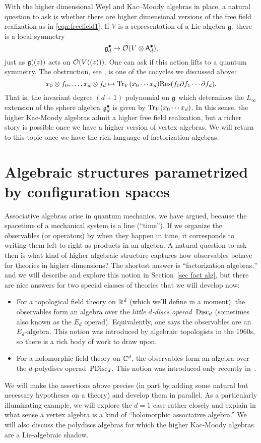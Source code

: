 \documentclass[11pt]{amsart}
\begin{document}
With the higher dimensional Weyl and Kac--Moody algebras in place, a natural question to ask is whether there are higher dimensional versions of the free field realization as in \eqref{eqn:freefield1}. 
If $V$ is a representation of a Lie algebra $\mathfrak g$,
there is a local symmetry 
\[
\mathfrak g^\bullet_d \to \mathcal O(V \otimes \mathsf A^{\bullet}_d),
\]
just as $\mathfrak g((z))$ acts on $\mathcal O(V((z)))$. 
One can ask if this action lifts to a quantum symmetry.
The obstruction, see \cite{GWkm}, is one of the cocycles we discussed above:
\[
x_0 \otimes f_0, \ldots, x_{d} \otimes f_{d} \mapsto {\rm Tr}_V( x_0 \cdots x_{d}) {\rm Res}(f_0 \partial f_1 \cdots \partial f_{d}).
\]
That is, the invariant degree $(d+1)$ polynomial on $\mathfrak g$ which determines the $L_\infty$ extension of the sphere algebra $\mathfrak g_d^\bullet$ is given by ${\rm Tr}_V (x_0 \cdots x_{d})$.
In this sense, the higher Kac-Moody algebras admit a higher free field realization,
but a richer story is possible once we have a higher version of vertex algebras.
We will return to this topic once we have the rich language of factorization algebras.

\section{Algebraic structures parametrized by configuration spaces}

Associative algebras arise in quantum mechanics, we have argued, because the spacetime of a mechanical system is a line (``time'').
If we organize the observables (or operators) by when they happen in time,
it corresponds to writing them left-to-right as products in an algebra.
A natural question to ask then is what kind of higher algebraic structure captures how observables behave for theories in higher dimensions?
The shortest answer is ``factorization algebras,'' and we will describe and explore this notion in Section~\ref{sec fact alg},
but there are nice answers for two special classes of theories that we will develop now:
\begin{itemize}
\item For a topological field theory on $\mathbb R^d$ (which we'll define in a moment),
the observables form an algebra over the {\em little $d$-discs operad}~${\rm Disc}_d$ (sometimes also known as the $E_d$ operad). 
Equivalently, one says the observables are an $E_d$-algebra. 
This notion was introduced by algebraic topologists in the 1960s, 
so there is a rich body of work to draw upon.
\item For a holomorphic field theory on $\mathbb C^d$,
the observables form an algebra over the $d$-polydiscs operad~${\rm PDisc}_d$.
This notion was introduced only recently in~\cite{CG1}.
\end{itemize}
We will make the assertions above precise (in part by adding some natural but necessary hypotheses on a theory)
and develop them in parallel.
As a particularly illuminating example, we will explore the $d=1$ case rather closely and explain in what sense a vertex algebra is a kind of ``holomorphic associative algebra.''
We will also discuss the polydiscs algebras for which the higher Kac-Moody algebras are a Lie-algebraic shadow.
\end{document}
